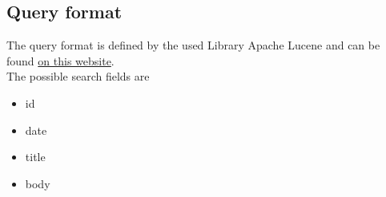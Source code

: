 \documentclass{scrartcl}
\begin{document}

\subsection{Query format}
The query format is defined by the used Library Apache Lucene and can be found \href{http://lucene.apache.org/core/4_6_0/queryparser/org/apache/lucene/queryparser/classic/package-summary.html#package_description}{on this website}.  \\
The possible search fields are 
\begin{itemize}
	\item id
	\item date
	\item title
	\item body
\end{itemize}

\end{document}
